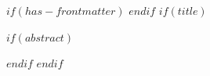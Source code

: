 $if(has-frontmatter)$
\frontmatter
$endif$
$if(title)$
\maketitle
$if(abstract)$
\begin{abstract}
$abstract$
\end{abstract}
$endif$
$endif$
